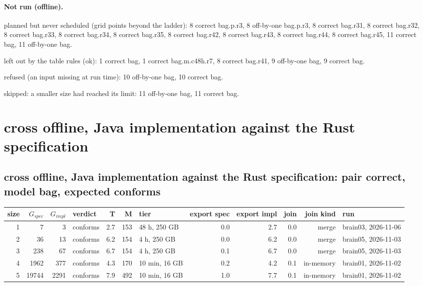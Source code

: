 \documentclass[10pt]{article}
\begin{document}
\paragraph{Not run (offline).}
planned but never scheduled (grid points beyond the ladder): 8 correct bag.p.r3, 8 off-by-one bag.p.r3, 8 correct bag.r31, 8 correct bag.r32, 8 correct bag.r33, 8 correct bag.r34, 8 correct bag.r35, 8 correct bag.r42, 8 correct bag.r43, 8 correct bag.r44, 8 correct bag.r45, 11 correct bag, 11 off-by-one bag.\par
left out by the table rules (ok): 1 correct bag, 1 correct bag.m.c48h.r7, 8 correct bag.r41, 9 off-by-one bag, 9 correct bag.\par
refused (an input missing at run time): 10 off-by-one bag, 10 correct bag.\par
skipped: a smaller size had reached its limit: 11 off-by-one bag, 11 correct bag.\par
\section*{cross offline, Java implementation against the Rust specification}
\subsection*{cross offline, Java implementation against the Rust specification: pair \textsf{correct}, model bag, expected conforms}
\begin{longtable}{@{}rrrlrrlrrrrl@{}}
\toprule
size & $G_{\mathit{spec}}$ & $G_{\mathit{impl}}$ & verdict & T & M & tier & export spec & export impl & join & join kind & run \\
\midrule
\endhead
\color{blue} 1 & 7 & 3 & conforms & 2.7 & 153 & 48 h, 250 GB & 0.0 & 2.7 & 0.0 & merge & brain03, 2026-11-06 \\
\color{blue} 2 & 36 & 13 & conforms & 6.2 & 154 & 4 h, 250 GB & 0.0 & 6.2 & 0.0 & merge & brain05, 2026-11-03 \\
\color{blue} 3 & 238 & 67 & conforms & 6.7 & 154 & 4 h, 250 GB & 0.1 & 6.7 & 0.0 & merge & brain05, 2026-11-03 \\
\color{red} 4 & 1962 & 377 & conforms & 4.3 & 170 & 10 min, 16 GB & 0.2 & 4.2 & 0.1 & in-memory & brain01, 2026-11-02 \\
\color{red} 5 & 19744 & 2291 & conforms & 7.9 & 492 & 10 min, 16 GB & 1.0 & 7.7 & 0.1 & in-memory & brain01, 2026-11-02 \\
\bottomrule
\end{longtable}
\end{document}
